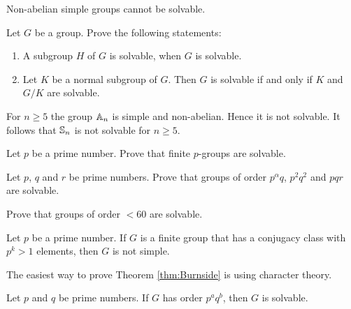 \begin{example}
	Non-abelian simple groups cannot be solvable. 
\end{example}

\begin{exercise}
	\label{xca:solvable}
	Let $G$ be a group. Prove the following statements:
	\begin{enumerate}
		\item A subgroup $H$ of $G$ is solvable, when $G$ is solvable.
		\item Let $K$ be a normal subgroup of $G$. 
		    Then $G$ is solvable if and only if $K$ and $G/K$ are solvable.
	\end{enumerate}
\end{exercise}

\begin{example}
    For $n\geq5$ the group $\mathbb{A}_n$ is simple and non-abelian. Hence it 
    is not solvable. It follows that 
    $\mathbb{S}_n$ is not solvable for $n\geq5$. 
\end{example}

\begin{exercise}
\label{xca:pgroups_solvable}
Let $p$ be a prime number. Prove that finite $p$-groups are solvable.
\end{exercise}

\begin{exercise}
\label{xca:Robinson:5.4.1}
    Let $p$, $q$ and $r$ be prime numbers. Prove that groups
    of order $p^\alpha q$, $p^2q^2$ and $pqr$ are solvable. 
\end{exercise}

\begin{exercise}
\label{xca:less60}
    Prove that groups of order $<60$ are solvable. 
\end{exercise}


\begin{theorem}[Burnside]
        \label{thm:Burnside}
	Let $p$ be a prime number. If $G$ is a finite group that has 
        a conjugacy class with $p^k>1$ elements, then $G$ 
	is not simple.
\end{theorem}

The easiest way to prove Theorem \ref{thm:Burnside}
is using character theory. %

\begin{theorem}[Burnside]
  Let $p$ and $q$ be prime numbers. If $G$ has order $p^aq^b$, then $G$ is solvable.
\end{theorem}

